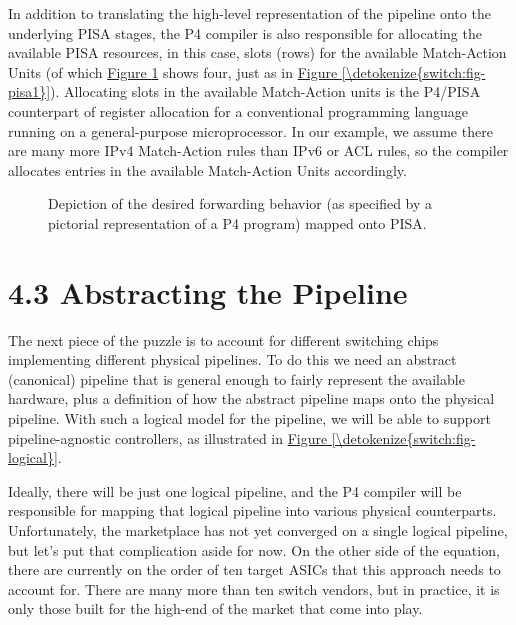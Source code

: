 \documentclass[letterpaper,11pt,english]{sphinxmanual}
\let\sphinxpxdimen\pdfpxdimen\else\newdimen\sphinxpxdimen
\begin{document}
In addition to translating the high-level representation of the
pipeline onto the underlying PISA stages, the P4 compiler is also
responsible for allocating the available PISA resources, in this case,
slots (rows) for the available Match-Action Units (of which
\hyperref[\detokenize{switch:fig-pisa2}]{Figure \ref{\detokenize{switch:fig-pisa2}}} shows four, just as in \hyperref[\detokenize{switch:fig-pisa1}]{Figure
\ref{\detokenize{switch:fig-pisa1}}}). Allocating slots in the available Match-Action units
is the P4/PISA counterpart of register allocation for a conventional
programming language running on a general-purpose microprocessor. In
our example, we assume there are many more IPv4 Match-Action rules
than IPv6 or ACL rules, so the compiler allocates entries in the
available Match-Action Units accordingly.

\begin{figure}[htbp]
\centering
\capstart

\noindent\sphinxincludegraphics[width=650\sphinxpxdimen]{{Slide12}.png}
\caption{Depiction of the desired forwarding behavior (as specified by a
pictorial representation of a P4 program) mapped onto PISA.}\label{\detokenize{switch:id11}}\label{\detokenize{switch:fig-pisa2}}\end{figure}


\section{4.3 Abstracting the Pipeline}
\label{\detokenize{switch:abstracting-the-pipeline}}
The next piece of the puzzle is to account for different switching
chips implementing different physical pipelines. To do this we need an
abstract (canonical) pipeline that is general enough to fairly
represent the available hardware, plus a definition of how the
abstract pipeline maps onto the physical pipeline. With such a logical
model for the pipeline, we will be able to support pipeline-agnostic
controllers, as illustrated in \hyperref[\detokenize{switch:fig-logical}]{Figure \ref{\detokenize{switch:fig-logical}}}.

Ideally, there will be just one logical pipeline, and the P4 compiler
will be responsible for mapping that logical pipeline into various
physical counterparts. Unfortunately, the marketplace has not yet
converged on a single logical pipeline, but let’s put that
complication aside for now. On the other side of the equation, there
are currently on the order of ten target ASICs that this approach
needs to account for. There are many more than ten switch vendors, but
in practice, it is only those built for the high-end of the market
that come into play.
\end{document}
